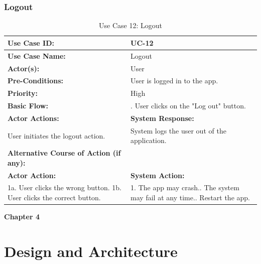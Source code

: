 \documentclass[12pt]{article}
\begin{document}
\subsubsection{Logout}
\vspace{0.5 cm}
    \begin{table}[H] %
    \centering
    \begin{tabular}{|p{4cm}|p{10cm}|}
        \hline
        \textbf{Use Case ID:} & UC-12 \\ \hline
        \textbf{Use Case Name:} & Logout \\ \hline
        \textbf{Actor(s):} & User \\ \hline
        \textbf{Pre-Conditions:} & 
        User is logged in to the app.\\ \hline
        \textbf{Priority:} & High \\ \hline
        \textbf{Basic Flow:} & . User clicks on the "Log out" button.\\ \hline
        \textbf{Actor Actions:} & \textbf{System Response:} \\ \hline
        User initiates the logout action. & System logs the user out of the application.\\ \hline
        \textbf{Alternative Course of Action (if any):} &  \\ \hline
        \textbf{Actor Action:} & \textbf{System Action:} \\ \hline
      1a. User clicks the wrong button.\newline
1b. User clicks the correct button. & 1. The app may crash.\newline
2. The system may fail at any time.\newline
3. Restart the app.\\ \hline
     \end{tabular}
     \caption{Use Case 12: Logout}
\end{table}

\newpage

\vspace*{1.5cm} %

\noindent
\LARGE \textbf{Chapter 4}

\vspace{1 cm}

\noindent
\section{Design and Architecture}
\end{document}
